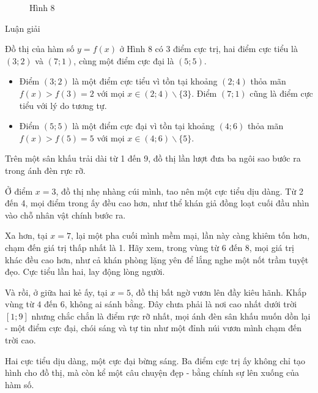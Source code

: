 \documentclass[
]{article}
\providecommand{\tightlist}{%
  \setlength{\itemsep}{0pt}\setlength{\parskip}{0pt}}\usepackage{longtable,booktabs,array}
\begin{document}
\begin{tcolorbox}
\begin{figure}[H]
{}

\caption{Hình 8}

\end{figure}%

Luận giải

Đồ thị của hàm số \(y=f(x)\) ở Hình 8 có 3 điểm cực trị, hai điểm cực
tiểu là \((3;2)\) và \((7;1)\), cùng một điểm cực đại là \((5;5)\).

\begin{itemize}
\tightlist
\item
  Điểm \((3;2)\) là một điểm cực tiểu vì tồn tại khoảng \((2;4)\) thỏa
  mãn \(f(x)>f(3)=2\) với mọi \(x\in(2;4)\backslash\{3\}\). Điểm
  \((7;1)\) cũng là điểm cực tiểu với lý do tương tự.\\
\item
  Điểm \((5;5)\) là một điểm cực đại vì tồn tại khoảng \((4;6)\) thỏa
  mãn \(f(x)>f(5)=5\) với mọi \(x\in(4;6)\backslash\{5\}\).
\end{itemize}

\begin{tcolorbox}[enhanced jigsaw, arc=.35mm, colback=white, bottomrule=.15mm, toptitle=1mm, left=2mm, breakable, colbacktitle=quarto-callout-tip-color!10!white, rightrule=.15mm, titlerule=0mm, leftrule=.75mm, bottomtitle=1mm, title={Ngách Mộng Du}, coltitle=black, colframe=quarto-callout-tip-color-frame, toprule=.15mm, opacitybacktitle=0.6, opacityback=0]

Trên một sân khấu trải dài từ 1 đến 9, đồ thị lần lượt đưa ba ngôi sao
bước ra trong ánh đèn rực rỡ.

Ở điểm \(x=3\), đồ thị nhẹ nhàng cúi mình, tao nên một cực tiểu dịu
dàng. Từ 2 đến 4, mọi điểm trong ấy đều cao hơn, như thể khán giả đồng
loạt cuối đầu nhìn vào chỗ nhân vật chính bước ra.

Xa hơn, tại \(x=7\), lại một pha cuối mình mềm mại, lần này càng khiêm
tốn hơn, chạm đến giá trị thấp nhất là 1. Hãy xem, trong vùng từ 6 đến
8, mọi giá trị khác đều cao hơn, như cả khán phòng lặng yên để lắng nghe
một nốt trầm tuyệt đẹo. Cực tiểu lần hai, lay động lòng người.

Và rồi, ở giữa hai kẻ ấy, tại \(x=5\), đồ thị bất ngờ vươn lên đầy kiêu
hãnh. Khắp vùng từ \(4\) đến \(6\), không ai sánh bằng. Đây chưa phải là
nơi cao nhất dưới trời \([1;9]\) nhưng chắc chắn là điểm rực rỡ nhất,
mọi ánh đèn sân khấu muốn dồn lại - một điểm cực đại, chói sáng và tự
tin như một đỉnh núi vươn mình chạm đến trời cao.

Hai cực tiểu dịu dàng, một cực đại bừng sáng. Ba điểm cực trị ấy không
chỉ tạo hình cho đồ thị, mà còn kể một câu chuyện đẹp - bằng chính sự
lên xuống của hàm số.


\end{tcolorbox}
\end{tcolorbox}
\end{document}
